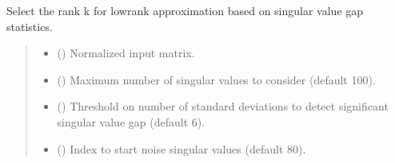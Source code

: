 \documentclass[letterpaper,10pt,english]{sphinxmanual}
\begin{document}
\begin{fulllineitems}
\label{\detokenize{core:pyALRA.core.choose_k}}
\pysigstartsignatures
\pysiglinewithargsret
{}
{\sphinxparamcomma {}\sphinxparamcomma {}\sphinxparamcomma {}\sphinxparamcomma {}\sphinxparamcomma {}\sphinxparamcomma {}}
{}
\pysigstopsignatures
\sphinxAtStartPar
Select the rank k for low\sphinxhyphen{}rank approximation based on singular value gap statistics.
\begin{quote}\begin{description}
\begin{itemize}
\item {} 
\sphinxAtStartPar
{} () \textendash{} Normalized input matrix.

\item {} 
\sphinxAtStartPar
{} (\sphinxstyleliteralemphasis{\sphinxupquote{, }}) \textendash{} Maximum number of singular values to consider (default 100).

\item {} 
\sphinxAtStartPar
{} (\sphinxstyleliteralemphasis{\sphinxupquote{, }}) \textendash{} Threshold on number of standard deviations to detect significant singular value gap (default 6).

\item {} 
\sphinxAtStartPar
{} (\sphinxstyleliteralemphasis{\sphinxupquote{, }}) \textendash{} Index to start noise singular values (default 80).


\end{itemize}
\end{description}
\end{quote}
\end{fulllineitems}
\end{document}
